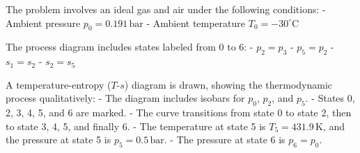 The problem involves an ideal gas and air under the following conditions:  
- Ambient pressure \( p_0 = 0.191 \, \text{bar} \)  
- Ambient temperature \( T_0 = -30^\circ\text{C} \)  

The process diagram includes states labeled from 0 to 6:  
- \( p_2 = p_3 \)  
- \( p_5 = p_2 \)  
- \( s_1 = s_2 \)  
- \( s_2 = s_5 \)  

A temperature-entropy (\( T \)-\( s \)) diagram is drawn, showing the thermodynamic process qualitatively:  
- The diagram includes isobars for \( p_0 \), \( p_2 \), and \( p_5 \).  
- States 0, 2, 3, 4, 5, and 6 are marked.  
- The curve transitions from state 0 to state 2, then to state 3, 4, 5, and finally 6.  
- The temperature at state 5 is \( T_5 = 431.9 \, \text{K} \), and the pressure at state 5 is \( p_5 = 0.5 \, \text{bar} \).  
- The pressure at state 6 is \( p_6 = p_0 \).